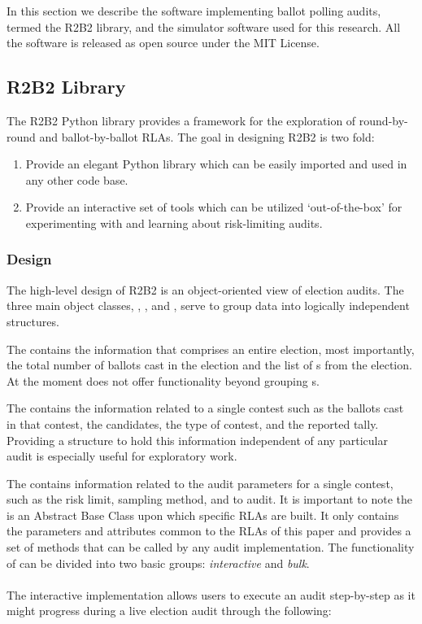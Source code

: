 In this section we describe the software implementing ballot polling audits, termed the R2B2 library, and the simulator software used for this research. All the software is released as open source under the MIT License.
\subsection{R2B2 Library}

The R2B2 Python library \cite{r2b2_anon} provides a framework for the exploration of round-by-round
and ballot-by-ballot RLAs. The goal in designing R2B2 is two fold:
\begin{enumerate}
    \item Provide an elegant Python library which can be easily imported and used
    in any other code base.
    \item Provide an interactive set of tools which can be utilized `out-of-the-box'
    for experimenting with and learning about risk-limiting audits.
\end{enumerate}

\subsubsection{Design}

The high-level design of R2B2 is an object-oriented view of election audits.
The three main object classes, , , and ,
serve to group data into logically independent structures.

The  contains the information that comprises an entire election,
most importantly, the total number of ballots cast in the election and the list
of s from the election. At the moment  does not offer
functionality beyond grouping s.

The  contains the information related to a single
contest such as the ballots cast in that contest, the candidates, the type of contest,
and the reported tally. Providing a structure to hold this information independent of
any particular audit is especially useful for exploratory work.

The  contains information related to the audit parameters for a single contest, 
such as the risk limit, sampling method, and  to audit. It is important
to note the  is an Abstract Base Class upon which specific RLAs are built.
It only contains the parameters and attributes common to the RLAs of this paper and provides a set
of methods that can be called by any audit implementation. The functionality of
 can be divided into two basic groups: \textit{interactive}
and \textit{bulk}.\\
\\
The interactive implementation allows users to execute an audit step-by-step as it
might progress during a live election audit through the following:

